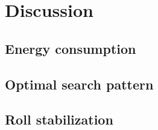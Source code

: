 \chapter{Discussion}


\section{Energy consumption}


\section{Optimal search pattern}



\section{Roll stabilization}